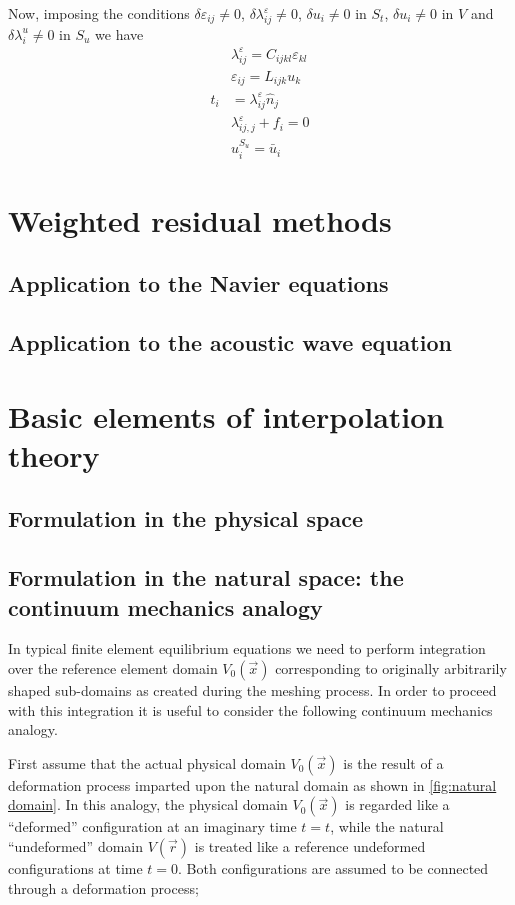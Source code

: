 Now, imposing the conditions $\delta {\varepsilon _{ij}} \neq 0$, $\delta \lambda _{ij}^\varepsilon  \neq 0$, $\delta {u_i} \neq 0$ in $S_t$, $\delta {u_i} \neq 0$ in $V$ and $\delta \lambda _i^u \neq 0$ in $S_u$ we have
%
\begin{align}
&\lambda _{ij}^\varepsilon  = C_{ijkl} \varepsilon_{kl}\\
&\varepsilon_{ij} = {L_{ijk}}{u_k}\\
t_i &= \lambda_{ij}^\varepsilon \hat{n}_j\\
&\lambda _{ij,j}^\varepsilon  + {f_i} = 0\\
&u_i^{S_u} = \bar{u}_i
\end{align}

\section{Weighted residual methods}
\subsection{Application to the Navier equations}
\subsection{Application to the acoustic wave equation}

\section{Basic elements of interpolation theory}
\subsection{Formulation in the physical space}
\subsection{Formulation in the natural space: the continuum mechanics analogy}
In typical finite element equilibrium equations we need to perform integration over the reference element domain $V_0(\vec{x})$ corresponding to originally arbitrarily shaped sub-domains as created during the meshing process.  In order to proceed with this integration it is useful to consider the following continuum mechanics analogy.

First assume that the actual physical domain $V_0(\vec{x})$ is the result of a deformation process imparted upon the natural domain as shown in \cref{fig:natural domain}. In this analogy, the physical domain $V_0(\vec{x})$ is regarded like a ``deformed'' configuration at an imaginary time $t=t$, while the natural ``undeformed'' domain $V(\vec{r})$   is treated like a reference undeformed configurations at time $t=0$. Both configurations are assumed to be connected through a deformation process;


